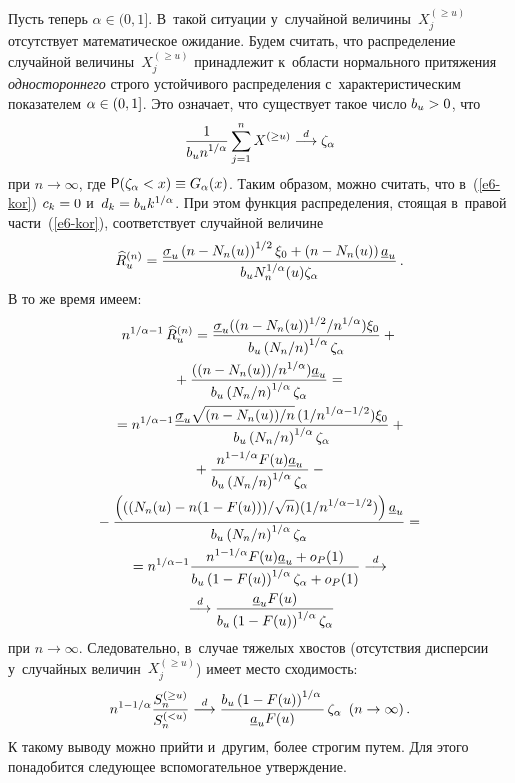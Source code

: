 \begin{multicols}{2}
Пусть теперь $\alpha\in(0,1]$. В~такой ситуации у~слу\-чай\-ной 
величины~$X_j^{(\ge u)}$ отсутствует математическое ожидание. 
Будем считать, что распределение случайной величины~$X_j^{(\ge u)}$ 
принадлежит к~об\-ласти нормального притяжения \textit{одностороннего} 
строго устойчивого распределения с~характеристическим показателем $\alpha
\hm\in(0,1]$. Это означает, что существует такое число $b_u\hm>0$, что
\begin{equation}
\displaystyle\frac{\displaystyle 1\mathstrut}{\displaystyle b_un^{1/\alpha}\mathstrut}\sum\limits_{j=1}^nX^{(\ge u)}\stackrel{d}{\longrightarrow} 
\zeta_{\alpha}\label{e8-kor}
\end{equation}
при $n\to\infty$, где ${\sf P}(\zeta_{\alpha}<x)\hm\equiv G_{\alpha}(x)$.
 Таким образом, можно считать, что в~(\ref{e6-kor}) 
 $c_k\hm=0$ и~$d_k\hm=b_uk^{1/\alpha}$. При этом функция распределения,
  стоящая в~правой части~(\ref{e6-kor}), соответствует случайной величине
$$
\widehat{R}_u^{(n)}=\displaystyle\frac{\displaystyle \underline{\sigma}_u
\left(n-N_n(u)\right)^{1/2} \xi_0+\left(n-N_n(u)\right)\underline{a}_u\mathstrut}{\displaystyle b_uN_n^{1/\alpha}(u) \zeta_{\alpha}\mathstrut}\,.
$$
В то же время имеем:
\begin{multline*}
n^{1/\alpha-1}\,\widehat{R}_u^{(n)}=
\displaystyle\frac{\displaystyle \underline{\sigma}_u
({(n-N_n(u))^{1/2}}/{n^{1/\alpha}})\xi_0\mathstrut}{\displaystyle b_u \left({N_n}/{n}\right)^{1/\alpha} \zeta_{\alpha}\mathstrut}
+{}\\
{}+\displaystyle\frac{\displaystyle (({n-N_n(u)})/{n^{1/\alpha}})\underline{a}_u\mathstrut}{\displaystyle b_u \left({N_n}/{n}\right)^{1/\alpha} \zeta_{\alpha}\mathstrut}={}
\\
{}=n^{1/\alpha-1}
\displaystyle\frac{\displaystyle \underline{\sigma}_u \sqrt{({n-N_n(u)})/{n}}\,
({1}/{n^{1/\alpha-1/2}})\xi_0\mathstrut}{\displaystyle b_u \left({N_n}/{n}\right)^{1/\alpha} \zeta_{\alpha}\mathstrut} +{}\\
{}+
\displaystyle\frac{\displaystyle n^{1-1/\alpha}F(u)\underline{a}_u\mathstrut}{\displaystyle b_u \left({N_n}/{n}\right)^{1/\alpha} \zeta_{\alpha}\mathstrut}-{}\\
{}-\displaystyle\frac{\displaystyle \left((({N_n(u)-n(1-F(u))})/{\sqrt{n}})
({1}/{n^{1/\alpha-1/2}})\right)\underline{a}_u\mathstrut}{\displaystyle b_u\left({N_n}/{n}\right)^{1/\alpha} \zeta_{\alpha}\mathstrut}={}
\\
{}=n^{1/\alpha-1}
\displaystyle\frac{\displaystyle n^{1-1/\alpha}F(u)\underline{a}_u+o_P(1)\mathstrut}{\displaystyle b_u\left(1-F(u)\right)^{1/\alpha}\zeta_{\alpha}+o_P(1)\mathstrut}\stackrel{d}{\longrightarrow} {}\\
{}\stackrel{d}{\longrightarrow}
\displaystyle\frac{\displaystyle \underline{a}_uF(u)\mathstrut}{\displaystyle b_u\left(1-F(u)\right)^{1/\alpha}\zeta_{\alpha}\mathstrut}
\end{multline*}
при $n\to\infty$. Следовательно, в~случае тяжелых хвостов 
(отсутствия дисперсии у~случайных величин~$X_j^{(\ge u)}$) 
имеет место сходимость:
$$
n^{1-1/\alpha}\displaystyle\frac{\displaystyle S_n^{(\ge u)}\mathstrut}{\displaystyle S_n^{(<u)}\mathstrut}\stackrel{d}{\longrightarrow} 
\displaystyle\frac{\displaystyle b_u\left(1-F(u)\right)^{1/\alpha}\mathstrut}{\displaystyle \underline{a}_uF(u)\mathstrut}\,
\zeta_{\alpha}\enskip (n\to\infty)\,.
$$
К такому выводу можно прийти и~другим, более строгим путем. 
Для этого понадобится следующее вспомогательное утверждение.


\end{multicols}
